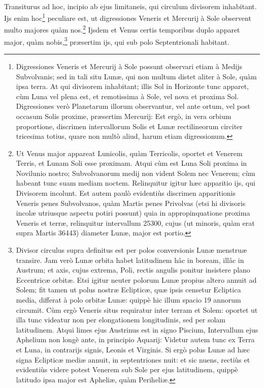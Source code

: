 \documentclass[a4paper, 11pt, oneside, polutonikogreek, german]{article}
\begin{document}
\paragraph{}
Transiturus ad hoc, incipio ab ejus limitaneis, qui circulum divisorem inhabitant. Ijs enim hoc\footnote{Digressiones Veneris et Mercurij à Sole possunt observari etiam à Medijs Subvolvanis; sed in tali situ Lunæ, qui non multum distet aliter à Sole, quàm ipsa terra. At qui divisorem inhabitant; illis Sol in Horizonte tunc apparet, cùm Luna vel plena est, et remotissima à Sole, vel nova et proxima Sol. Digressiones verò Planetarum illorum observantur, vel ante ortum, vel post occasum Solis proxime, præsertim Mercurij: Est ergò, in vera orbium proportione, discrimen intervallorum Solis et Lunæ rectilineorum circiter tricesima totius, quare non multò aliud, harum etiam digressionum.} peculiare est, ut digressiones Veneris et Mercurij à Sole observent multo majores quàm nos.\footnote{Ut Venus major appareat Lunicolis, quàm Terricolis, oportet et Venerem Terris, et Lunam Soli esse proximam. Atqui cùm est Luna Soli proxima in Novilunio nostro; Subvolvanorum medij non vident Solem nec Venerem; cùm habeant tunc suam mediam noctem. Relinquitur igitur hæc apparitio ijs, qui Divisorem incolunt. Est autem paulò evidentiùs discrimen apparitionis Veneris penes Subvolvanos, quàm Martis penes Privolvas (etsi hi divisoris incolæ utriusque aspectu potiri possunt) quia in appropinquatione proxima Veneris et terræ, relinquitur intervallum 25300, cujus (ut minoris, quàm erat supra Martis 36443) diameter Lunæ, major est portio.} Ijsdem et Venus certis temporibus duplo apparet major, quàm nobis,\footnote{Divisor circulus supra definitus est per polos conversionis Lunæ menstruæ transire. Jam verò Lunæ orbita habet latitudinem hâc in boream, illâc in Austrum; et axis, cujus extrema, Poli, rectis angulis ponitur insistere plano Eccentricæ orbitæ. Etsi igitur neuter polorum Lunæ propius altero annuit ad Solem; fit tamen ut polus nostræ Eclipticæ, quæ ipsis censetur Ecliptica media, differat à polo orbitæ Lunæ: quippè hic illum spacio 19 annorum circumit. Cùm ergò Veneris situs requiratur inter terram et Solem: oportet ut illa tunc videatur non per elongationem longitudinis, sed per solam latitudinem. Atqui limes ejus Austrinus est in signo Piscium, Intervallum ejus Aphelium non longè ante, in principio Aquarij: Videtur autem tunc ex Terra et Luna, in contrarijs signis, Leonis et Virginis. Si ergò polus Lunæ ad hæc signa Eclipticæ mediæ annuit, in septentriones nuit: et sic nuens, rectiùs et evidentiùs videre potest Venerem sub Sole per ejus latitudinem, quippè latitudo ipsa major est Apheliæ, quàm Periheliæ.} præsertim ijs, qui sub polo Septentrionali habitant.
\end{document}
